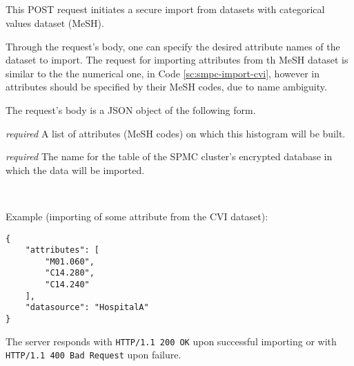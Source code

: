 \subsection[/smpc/import/categorical POST request]{\protect{}}\label{s:post5}
This POST request initiates a secure import from datasets with categorical values dataset (MeSH).
\begin{description}[labelwidth=5em, leftmargin=\dimexpr\labelwidth+\labelsep\relax]
\item[Request:] Through the request's body, one can specify the desired attribute names of the dataset to import.
The request for importing attributes from th MeSH dataset is similar to the the numerical one, in Code \ref{sc:smpc-import-cvi}, however in attributes should be specified by their MeSH codes, due to name ambiguity.

The request's body is a JSON object of the following form.

\begin{description}[labelwidth=6em, leftmargin=\dimexpr\labelwidth+\labelsep\relax]

    \item[\texttt{attributes}:] {\color{red}\textit{required}} A list of attributes (MeSH codes) on which this histogram will be built.

    \item[\texttt{datasource}:] {\color{red}\textit{required}} The name for the table of the SPMC cluster's encrypted database in which the data  will be imported.

\end{description}

\ \\
\begin{minipage}{\linewidth}
  Example (importing of some attribute from the CVI dataset):\\
{
\begin{verbatim}
{
    "attributes": [
        "M01.060",
        "C14.280",
        "C14.240"
    ],
    "datasource": "HospitalA"
}
\end{verbatim}
\label{sc:smpc-import-mesh}
}
\end{minipage}

\item[Response:] The server responds with \texttt{HTTP/1.1 200 OK} upon successful importing or with \texttt{HTTP/1.1 400 Bad Request} upon failure.
\end{description}


